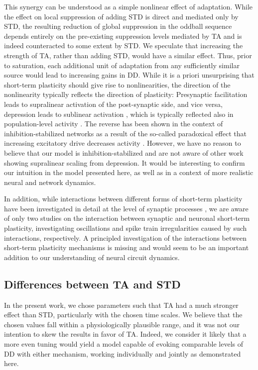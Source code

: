 \documentclass[9pt,lineno,onehalfspacing]{elife}
\begin{document}
This synergy can be understood as a simple nonlinear effect of adaptation. While the effect on local suppression of adding STD is direct and mediated only by STD, the resulting reduction of global suppression in the oddball sequence depends entirely on the pre-existing suppression levels mediated by TA and is indeed counteracted to some extent by STD. We speculate that increasing the strength of TA, rather than adding STD, would have a similar effect. Thus, prior to saturation, each additional unit of adaptation from any sufficiently similar source would lead to increasing gains in DD. While it is a priori unsurprising that short-term plasticity should give rise to nonlinearities, the direction of the nonlinearity typically reflects the direction of plasticity: Presynaptic facilitation leads to supralinear activation of the post-synaptic side, and vice versa, depression leads to sublinear activation \citep{Tsodyks1997-qt, Varela1997-nr}, which is typically reflected also in population-level activity \citep{Tsodyks1998-bq}. The reverse has been shown in the context of inhibition-stabilized networks \citep{Wu2022-qx} as a result of the so-called paradoxical effect that increasing excitatory drive decreases activity \citep{Tsodyks1997-hr, Sanzeni2020-su}. However, we have no reason to believe that our model is inhibition-stabilized and are not aware of other work showing supralinear scaling from depression. It would be interesting to confirm our intuition in the model presented here, as well as in a context of more realistic neural and network dynamics.

In addition, while interactions between different forms of short-term plasticity have been investigated in detail at the level of synaptic processes \citep{Tsodyks1997-qt, Varela1997-nr, Buonomano1998-hf, Hennig2008-sc, Anwar2017-qg, Mondal2022-av}, we are aware of only two studies on the interaction between synaptic and neuronal short-term plasticity, investigating oscillations \citep{Mejias2011-rv} and spike train irregularities \citep{Ileri2015-eu} caused by such interactions, respectively. A principled investigation of the interactions between short-term plasticity mechanisms is missing and would seem to be an important addition to our understanding of neural circuit dynamics.

\subsection{Differences between TA and STD}

In the present work, we chose parameters such that TA had a much stronger effect than STD, particularly with the chosen time scales. We believe that the chosen values fall within a physiologically plausible range, and it was not our intention to skew the results in favor of TA. Indeed, we consider it likely that a more even tuning would yield a model capable of evoking comparable levels of DD with either mechanism, working individually and jointly as demonstrated here.
\end{document}
